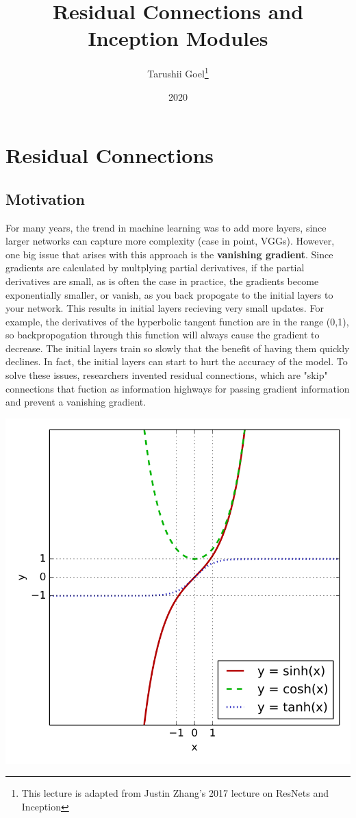 \documentclass{article}
\title{Residual Connections and Inception Modules}
\author{Tarushii Goel\footnote{This lecture is adapted from Justin Zhang's 2017 lecture on ResNets and Inception}}
\date{2020}
\begin{document}
\maketitle

\section{Residual Connections}
\subsection{Motivation}
For many years, the trend in machine learning was to add more layers, since larger networks can capture more complexity (case in point, VGGs). However, one big issue that arises with this approach is the {\bf vanishing gradient}. Since gradients are calculated by multplying partial derivatives, if the partial derivatives are small, as is often the case in practice, the gradients become exponentially smaller, or vanish, as you back propogate to the initial layers to your network. This results in initial layers recieving very small updates. For example, the derivatives of the hyperbolic tangent function are in the range (0,1), so backpropogation through this function will always cause the gradient to decrease. The initial layers train so slowly that the benefit of having them quickly declines. In fact, the initial layers can start to hurt the accuracy of the model. To solve these issues, researchers invented residual connections, which are "skip" connections that fuction as information highways for passing gradient information and prevent a vanishing gradient. 
\begin{center}
\includegraphics[scale=0.2]{tanh.png}
\end{center}
\end{document}
